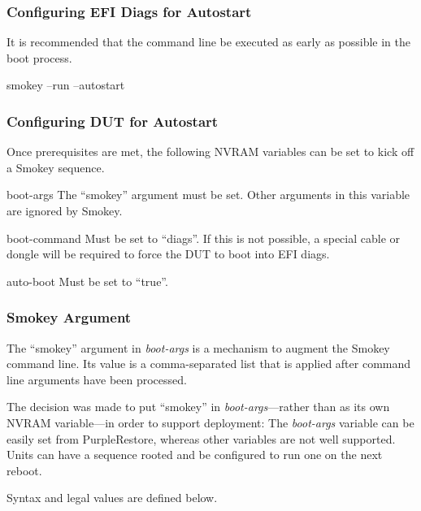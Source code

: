 \documentclass[11pt]{article}
\newcommand{\nvram}[1]{\mbox{\itshape#1}}
\newcommand{\nvarg}[1]{\mbox{``#1''}}
\begin{document}
\subsubsection{Configuring EFI Diags for Autostart}

It is recommended that the command line be executed as early as possible in the
boot process.

\begin{CommandLine}
smokey --run --autostart
\end{CommandLine}

\subsubsection{Configuring DUT for Autostart}

Once prerequisites are met, the following NVRAM variables can be set to kick
off a Smokey sequence.

\begin{Definition}

\item[boot-args] The \nvarg{smokey} argument must be set.  Other arguments in this
	variable are ignored by Smokey.

\item[boot-command] Must be set to \nvarg{diags}.  If this is not possible, a
	special cable or dongle will be required to force the DUT to boot into
	EFI diags.

\item[auto-boot] Must be set to \nvarg{true}.

\end{Definition}

\subsubsection{Smokey Argument}

The \nvarg{smokey} argument in \nvram{boot-args} is a mechanism to augment the Smokey command
line.  Its value is a comma-separated list that is applied after command line
arguments have been processed.

The decision was made to put \nvarg{smokey} in \nvram{boot-args}---rather than as its own NVRAM
variable---in order to support deployment:  The \nvram{boot-args} variable can be easily
set from PurpleRestore, whereas other variables are not well supported.  Units
can have a sequence rooted and be configured to run one on the next reboot.

Syntax and legal values are defined below.
\end{document}
